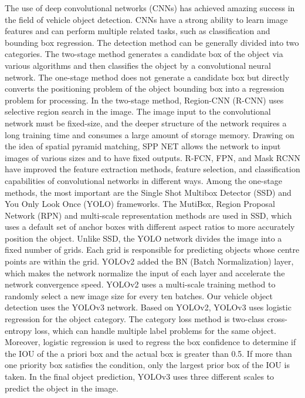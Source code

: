 \begin{sloppypar}
The use of deep convolutional networks (CNNs) has achieved amazing success in the field of vehicle object detection. CNNs have a strong ability to learn image features and can perform multiple related tasks, such as classification and bounding box regression. The detection method can be generally divided into two categories. The two-stage method generates a candidate box of the object via various algorithms and then classifies the object by a convolutional neural network. The one-stage method does not generate a candidate box but directly converts the positioning problem of the object bounding box into a regression problem for processing. In the two-stage method, Region-CNN (R-CNN) uses selective region search in the image. The image input to the convolutional network must be fixed-size, and the deeper structure of the network requires a long training time and consumes a large amount of storage memory. Drawing on the idea of spatial pyramid matching, SPP NET  allows the network to input images of various sizes and to have fixed outputs. R-FCN, FPN, and Mask RCNN have improved the feature extraction methods, feature selection, and classification capabilities of convolutional networks in different ways. Among the one-stage methods, the most important are the Single Shot Multibox Detector (SSD) and You Only Look Once (YOLO)  frameworks. The MutiBox, Region Proposal Network (RPN) and multi-scale representation methods are used in SSD, which uses a default set of anchor boxes with different aspect ratios to more accurately position the object. Unlike SSD, the YOLO network divides the image into a fixed number of grids. Each grid is responsible for predicting objects whose centre points are within the grid. YOLOv2 added the BN (Batch Normalization) layer, which makes the network normalize the input of each layer and accelerate the network convergence speed. YOLOv2 uses a multi-scale training method to randomly select a new image size for every ten batches. Our vehicle object detection uses the YOLOv3  network. Based on YOLOv2, YOLOv3 uses logistic regression for the object category. The category loss method is two-class cross-entropy loss, which can handle multiple label problems for the same object. Moreover, logistic regression is used to regress the box confidence to determine if the IOU of the a priori box and the actual box is greater than 0.5. If more than one priority box satisfies the condition, only the largest prior box of the IOU is taken. In the final object prediction, YOLOv3 uses three different scales to predict the object in the image.

\end{sloppypar}
